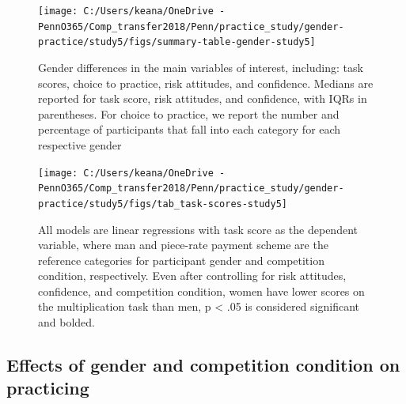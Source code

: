 \documentclass[a4paper, nobind]{templates/ociamthesis}
\begin{document}
\begin{figure}

{\centering \texttt{[image: C:/Users/keana/OneDrive - PennO365/Comp\_transfer2018/Penn/practice\_study/gender-practice/study5/figs/summary-table-gender-study5]} 

}

\caption{Gender differences in the main variables of interest, including: task scores, choice to practice, risk attitudes, and confidence. Medians are reported for task score, risk attitudes, and confidence, with IQRs in parentheses. For choice to practice, we report the number and percentage of participants that fall into each category for each respective gender}\label{fig:summary-table-gender-study5}
\end{figure}

\begin{figure}

{\centering \texttt{[image: C:/Users/keana/OneDrive - PennO365/Comp\_transfer2018/Penn/practice\_study/gender-practice/study5/figs/tab\_task-scores-study5]} 

}

\caption{All models are linear regressions with task score as the dependent variable, where man and piece-rate payment scheme are the reference categories for participant gender and competition condition, respectively. Even after controlling for risk attitudes, confidence, and competition condition, women have lower scores on the multiplication task than men, p < .05 is considered significant and bolded.}\label{fig:tab-task-scores-study5}
\end{figure}

\hypertarget{effects-of-gender-and-competition-condition-on-practicing}{%
\subsection{Effects of gender and competition condition on practicing}\label{effects-of-gender-and-competition-condition-on-practicing}}
\end{document}

